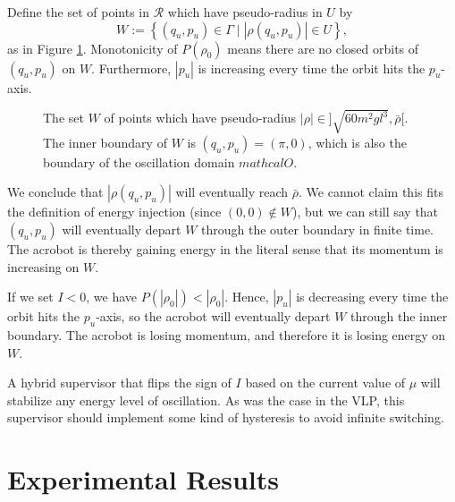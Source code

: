 Define the set of points in \(\mathcal{R}\) which have pseudo-radius in \(U\) by
\[
    W := \left\{(q_u,p_u) \in \Gamma \mid |\rho(q_u,p_u)| \in U \right\}
    ,
\]
as in Figure \ref{fig:acrobot-rot-W}.
Monotonicity of \(P(\rho_0)\) means there are no closed orbits of 
\((q_u,p_u)\) on \(W\). 
Furthermore, \(|p_u|\) is increasing every time the orbit hits the
\(p_u\)-axis. 

\begin{figure}
    \centering
    \caption{The set \(W\) of points which have pseudo-radius 
        \(|\rho| \in ]\sqrt{60m^2gl^3}, \bar{\rho}[\). The inner boundary of \(W\)
        is \((q_u,p_u) = (\pi,0)\), which is also the boundary of the
        oscillation domain \(mathcal{O}\).}
    \label{fig:acrobot-rot-W}
\end{figure}

We conclude that \(|\rho(q_u,p_u)|\) will eventually reach \(\bar{\rho}\). 
We cannot claim this fits the definition  of energy injection 
(since \((0,0) \notin W\)), but we can still say that \((q_u,p_u)\) will
eventually depart \(W\) through the outer boundary in finite time.
The acrobot is thereby gaining energy in the literal sense that its momentum
is increasing on \(W\).

If we set \(I < 0\), we have \(P(|\rho_0|) < |\rho_0|\).
Hence, \(|p_u|\) is decreasing every time the orbit hits the \(p_u\)-axis, so
the acrobot will eventually depart \(W\) through the inner boundary. 
The acrobot is losing momentum, and therefore it is losing energy on \(W\).

A hybrid supervisor that flips the sign of \(I\) based on the current
value of \(\mu\) will stabilize any energy level of oscillation.
As was the case in the VLP, this supervisor should implement some kind of
hysteresis to avoid infinite switching.


\section{Experimental Results}

